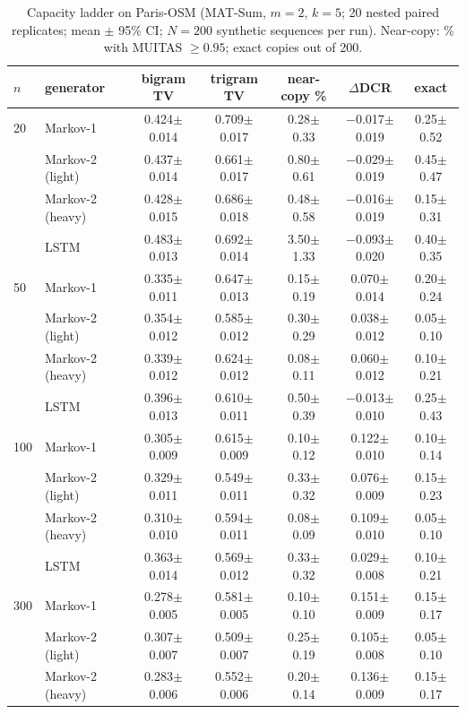 \begin{table}[!t]
\caption{Capacity ladder on Paris-OSM (MAT-Sum, $m{=}2$, $k{=}5$; 20 nested paired replicates; mean $\pm$ 95\% CI; $N{=}200$ synthetic sequences per run). Near-copy: \% with MUITAS $\ge 0.95$; exact copies out of 200.}
\label{tab:supp-order2-full}
\centering\small
\begin{tabular}{llccccc}
\toprule
$n$ & generator & bigram TV & trigram TV & near-copy \% & $\Delta$DCR & exact \\
\midrule
20 & Markov-1 & 0.424$\pm$0.014 & 0.709$\pm$0.017 & 0.28$\pm$0.33 & $-$0.017$\pm$0.019 & 0.25$\pm$0.52 \\
 & Markov-2 (light) & 0.437$\pm$0.014 & 0.661$\pm$0.017 & 0.80$\pm$0.61 & $-$0.029$\pm$0.019 & 0.45$\pm$0.47 \\
 & Markov-2 (heavy) & 0.428$\pm$0.015 & 0.686$\pm$0.018 & 0.48$\pm$0.58 & $-$0.016$\pm$0.019 & 0.15$\pm$0.31 \\
 & LSTM & 0.483$\pm$0.013 & 0.692$\pm$0.014 & 3.50$\pm$1.33 & $-$0.093$\pm$0.020 & 0.40$\pm$0.35 \\
\midrule
50 & Markov-1 & 0.335$\pm$0.011 & 0.647$\pm$0.013 & 0.15$\pm$0.19 & 0.070$\pm$0.014 & 0.20$\pm$0.24 \\
 & Markov-2 (light) & 0.354$\pm$0.012 & 0.585$\pm$0.012 & 0.30$\pm$0.29 & 0.038$\pm$0.012 & 0.05$\pm$0.10 \\
 & Markov-2 (heavy) & 0.339$\pm$0.012 & 0.624$\pm$0.012 & 0.08$\pm$0.11 & 0.060$\pm$0.012 & 0.10$\pm$0.21 \\
 & LSTM & 0.396$\pm$0.013 & 0.610$\pm$0.011 & 0.50$\pm$0.39 & $-$0.013$\pm$0.010 & 0.25$\pm$0.43 \\
\midrule
100 & Markov-1 & 0.305$\pm$0.009 & 0.615$\pm$0.009 & 0.10$\pm$0.12 & 0.122$\pm$0.010 & 0.10$\pm$0.14 \\
 & Markov-2 (light) & 0.329$\pm$0.011 & 0.549$\pm$0.011 & 0.33$\pm$0.32 & 0.076$\pm$0.009 & 0.15$\pm$0.23 \\
 & Markov-2 (heavy) & 0.310$\pm$0.010 & 0.594$\pm$0.011 & 0.08$\pm$0.09 & 0.109$\pm$0.010 & 0.05$\pm$0.10 \\
 & LSTM & 0.363$\pm$0.014 & 0.569$\pm$0.012 & 0.33$\pm$0.32 & 0.029$\pm$0.008 & 0.10$\pm$0.21 \\
\midrule
300 & Markov-1 & 0.278$\pm$0.005 & 0.581$\pm$0.005 & 0.10$\pm$0.10 & 0.151$\pm$0.009 & 0.15$\pm$0.17 \\
 & Markov-2 (light) & 0.307$\pm$0.007 & 0.509$\pm$0.007 & 0.25$\pm$0.19 & 0.105$\pm$0.008 & 0.05$\pm$0.10 \\
 & Markov-2 (heavy) & 0.283$\pm$0.006 & 0.552$\pm$0.006 & 0.20$\pm$0.14 & 0.136$\pm$0.009 & 0.15$\pm$0.17 \\

\end{tabular}
\end{table}
